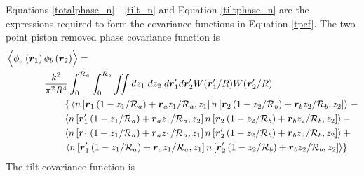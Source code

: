 Equations \ref{totalphase_n} - \ref{tilt_n} and Equation
\ref{tiltphase_n} are the expressions required to form the covariance
functions in Equation \ref{tpcf}.  The two-point piston removed phase
covariance function is
\begin{equation}\label{prphase_n}
\begin{aligned}
&\left\langle \vphantom{\hat{\phi}_{a}} \phi_{a}\left(\boldsymbol{r}_{1}\right) \phi_{b}\left(\boldsymbol{r}_{2}\right)\right\rangle = \\
&\quad\quad\quad\quad
\frac{k^{2}}{\pi^{2}R^{4}} \int_{0}^{\mathcal{R}_{a}}  \int_{0}^{\mathcal{R}_{b}} \iint dz_{1} \; dz_{2} \; d\boldsymbol{r}^{\prime}_{1}d\boldsymbol{r}^{\prime}_{2} W(\boldsymbol{r}^{\prime}_{1}/R) W(\boldsymbol{r}^{\prime}_{2}/R) \\
&\quad\quad\quad\quad\quad\quad
\left\{\vphantom{\boldsymbol{r}^{\prime}_{1}}
\left\langle n\left[\boldsymbol{r}_{1}\left(1-z_{1}/\mathcal{R}_{a}\right) + \boldsymbol{r}_{a} z_{1}/\mathcal{R}_{a}, z_{1}\right]
 n\left[\boldsymbol{r}_{2}\left(1-z_{2}/\mathcal{R}_{b}\right) + \boldsymbol{r}_{b} z_{2}/\mathcal{R}_{b}, z_{2}\right] \right\rangle\right. -
\\
&\quad\quad\quad\quad\quad\quad
\left\langle n\left[\boldsymbol{r}^{\prime}_{1}\left(1-z_{1}/\mathcal{R}_{a}\right) + \boldsymbol{r}_{a} z_{1}/\mathcal{R}_{a}, z_{2}\right]
 n\left[\boldsymbol{r}_{2}\left(1-z_{2}/\mathcal{R}_{b}\right) + \boldsymbol{r}_{b} z_{2}/\mathcal{R}_{b}, z_{2}\right] \right\rangle -
\\
&\quad\quad\quad\quad\quad\quad
\left\langle n\left[\boldsymbol{r}_{1}\left(1-z_{1}/\mathcal{R}_{a}\right) + \boldsymbol{r}_{a} z_{1}/\mathcal{R}_{a}, z_{1}\right]
 n\left[\boldsymbol{r}^{\prime}_{2}\left(1-z_{2}/\mathcal{R}_{b}\right) + \boldsymbol{r}_{b} z_{2}/\mathcal{R}_{b}, z_{2}\right] \right\rangle +
\\
&\quad\quad\quad\quad\quad\quad
\left.
\left\langle n\left[\boldsymbol{r}^{\prime}_{1}\left(1-z_{1}/\mathcal{R}_{a}\right) + \boldsymbol{r}_{a} z_{1}/\mathcal{R}_{a}, z_{1}\right]
 n\left[\boldsymbol{r}^{\prime}_{2}\left(1-z_{2}/\mathcal{R}_{b}\right) + \boldsymbol{r}_{b} z_{2}/\mathcal{R}_{b}, z_{2}\right] \right\rangle
\right\}
\end{aligned}
\end{equation}
The tilt covariance function is
